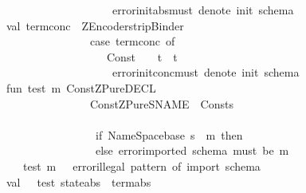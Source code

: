 \begin{isabellebody}
\ \ \ \ \ \ \ \ \ \ \ \ \ \ \ \ \ \ \ \ \ \ \ \ \ \ \ {\isacharbar}\ {\isacharunderscore}\ {\isacharequal}{\isachargreater}\ error{\isacharparenleft}init{\isacharunderscore}abs{\isacharcircum}{\isachardoublequote}must\ denote\ init\ schema{\isacharbang}{\isachardoublequote}{\isacharparenright}{\isacharparenright}\isanewline
\ \ \ \ \ \ \ \ \ \ \ val\ term{\isacharunderscore}conc\ {\isacharequal}\ ZEncoder{\isachardot}strip{\isacharunderscore}Binder\isanewline
\ \ \ \ \ \ \ \ \ \ \ \ \ \ \ \ \ \ \ \ \ \ \ \ \ \ {\isacharparenleft}case\ term{\isacharunderscore}conc\ of\isanewline
\ \ \ \ \ \ \ \ \ \ \ \ \ \ \ \ \ \ \ \ \ \ \ \ \ \ \ \ \ Const{\isacharparenleft}{\isachardoublequote}{\isacharequal}{\isacharequal}{\isachardoublequote}{\isacharcomma}{\isacharunderscore}{\isacharparenright}\ {\isachardollar}\ {\isacharunderscore}\ {\isachardollar}\ t\ {\isacharequal}{\isachargreater}\ t\isanewline
\ \ \ \ \ \ \ \ \ \ \ \ \ \ \ \ \ \ \ \ \ \ \ \ \ \ \ {\isacharbar}\ {\isacharunderscore}\ {\isacharequal}{\isachargreater}\ error{\isacharparenleft}init{\isacharunderscore}conc{\isacharcircum}{\isachardoublequote}must\ denote\ init\ schema{\isacharbang}{\isachardoublequote}{\isacharparenright}{\isacharparenright}\isanewline
\ \ \ \ \ \ \ \ \ \ \ fun\ test\ m\ {\isacharparenleft}Const{\isacharparenleft}{\isachardoublequote}ZPure{\isachardot}DECL{\isachardoublequote}{\isacharcomma}{\isacharunderscore}{\isacharparenright}\ \ \isanewline
\ \ \ \ \ \ \ \ \ \ \ \ \ \ \ \ \ \ \ \ \ \ \ \ \ {\isachardollar}\ {\isacharparenleft}Const{\isacharparenleft}{\isachardoublequote}ZPure{\isachardot}SNAME{\isachardoublequote}{\isacharcomma}{\isacharunderscore}{\isacharparenright}\ {\isachardollar}\ Const{\isacharparenleft}s{\isacharcomma}{\isacharunderscore}{\isacharparenright}\ {\isachardollar}{\isacharunderscore}{\isacharparenright}\ \isanewline
\ \ \ \ \ \ \ \ \ \ \ \ \ \ \ \ \ \ \ \ \ \ \ \ \ {\isachardollar}\ {\isacharunderscore}{\isacharparenright}\ {\isacharequal}\ \isanewline
\ \ \ \ \ \ \ \ \ \ \ \ \ \ \ \ \ \ \ \ \ \ \ \ \ \ \ if\ {\isacharparenleft}NameSpace{\isachardot}base\ s{\isacharparenright}\ {\isacharequal}\ m\ then\ {\isacharparenleft}{\isacharparenright}\isanewline
\ \ \ \ \ \ \ \ \ \ \ \ \ \ \ \ \ \ \ \ \ \ \ \ \ \ \ else\ error{\isacharparenleft}{\isachardoublequote}imported\ schema\ must\ be\ {\isacharcolon}{\isachardoublequote}{\isacharcircum}m{\isacharparenright}\isanewline
\ \ \ \ \ \ \ \ \ \ \ \ \ \ {\isacharbar}test\ m\ {\isacharunderscore}\ {\isacharequal}\ error{\isachardoublequote}illegal\ pattern\ of\ import\ schema{\isachardoublequote}\isanewline
\ \ \ \ \ \ \ \ \ \ \ val\ {\isacharunderscore}\ {\isacharequal}\ test\ state{\isacharunderscore}abs\ \ term{\isacharunderscore}abs\isanewline

\end{isabellebody}
